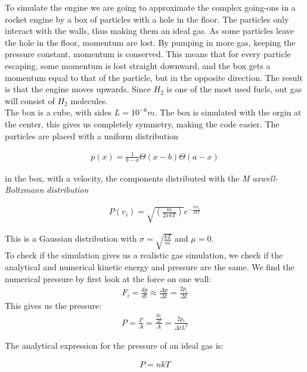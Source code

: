 \documentclass[a4paper, 10pt]{article}
\begin{document}
To simulate the engine we are going to approximate the complex going-ons in a rocket engine by a box of particles with a hole in the floor. The particles only interact with the walls, thus making them an ideal gas. As some particles leave the hole in the floor, momentum are lost. By pumping in more gas, keeping the pressure constant, momentum is conserved. This means that for every particle escaping, some momentum is lost straight downward, and the box gets a momentum equal to that of the particle, but in the opposite direction. The result is that the engine moves upwards. Since $H_2$ is one of the most used fuels, out gas will consist of $H_2$ molecules.\\

The box is a cube, with sides $L = 10^{-6}m$. The box is simulated with the orgin at the center, this gives us completely symmetry, making the code easier. The particles are placed with a uniform distribution 

\begin{align}
p(x) = \frac{1}{b-a}\Theta(x-b)\Theta(a-x)
\end{align}

in the box, with a velocity, the components distributed with the \textit{M axwell-Boltzmann distribution}

\begin{align}
P(v_i) = \sqrt{\left( \frac{m}{2 \pi k T} \right)} e^{-\frac{m v_i}{2kT}}
\end{align}

This is a Gaussian distribution with $\sigma = \sqrt{ \frac{kT}{m}}$
and $\mu = 0$.\\

To check if the simulation gives us a realistic gas simulation, we check if the analytical and numerical kinetic energy and pressure are the same. We find the numerical pressure by first look at the force on one wall:
\begin{align}
F_i = \frac{dp}{dt} \approx \frac{\Delta p}{\Delta t} = \frac{2p_i}{\Delta t}
\end{align}
This gives us the pressure:
\begin{align}
P = \frac{F}{A} = \frac{\frac{2p_i}{\Delta t}}{A} = \frac{2p_i}{\Delta t L^{2}}
\end{align}

The analytical expression for the pressure of an ideal gas is:

\begin{align}
P = nkT
\end{align}
\end{document}
